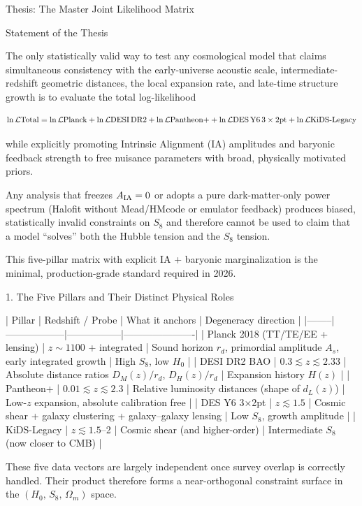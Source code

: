 Thesis: The Master Joint Likelihood Matrix

Statement of the Thesis

The only statistically valid way to test any cosmological model that claims simultaneous consistency with the early-universe acoustic scale, intermediate-redshift geometric distances, the local expansion rate, and late-time structure growth is to evaluate the total log-likelihood

\[
\ln\mathcal{L}{\rm Total} = \ln\mathcal{L}{\rm Planck} + \ln\mathcal{L}{\rm DESI\,DR2} + \ln\mathcal{L}{\rm Pantheon+} + \ln\mathcal{L}{\rm DES\,Y6\,3\times2pt} + \ln\mathcal{L}{\rm KiDS\text{-}Legacy}
\]

while explicitly promoting Intrinsic Alignment (IA) amplitudes and baryonic feedback strength to free nuisance parameters with broad, physically motivated priors.  

Any analysis that freezes \(A_{\rm IA}=0\) or adopts a pure dark-matter-only power spectrum (Halofit without Mead/HMcode or emulator feedback) produces biased, statistically invalid constraints on \(S_8\) and therefore cannot be used to claim that a model “solves” both the Hubble tension and the \(S_8\) tension.

This five-pillar matrix with explicit IA + baryonic marginalization is the minimal, production-grade standard required in 2026.

1. The Five Pillars and Their Distinct Physical Roles

| Pillar | Redshift / Probe | What it anchors | Degeneracy direction |
|--------|------------------|-----------------|----------------------|
| Planck 2018 (TT/TE/EE + lensing) | \(z\sim 1100\) + integrated | Sound horizon \(r_d\), primordial amplitude \(A_s\), early integrated growth | High \(S_8\), low \(H_0\) |
| DESI DR2 BAO | \(0.3 \lesssim z \lesssim 2.33\) | Absolute distance ratios \(D_M(z)/r_d\), \(D_H(z)/r_d\) | Expansion history \(H(z)\) |
| Pantheon+ | \(0.01 \lesssim z \lesssim 2.3\) | Relative luminosity distances (shape of \(d_L(z)\)) | Low-\(z\) expansion, absolute calibration free |
| DES Y6 3×2pt | \(z\lesssim 1.5\) | Cosmic shear + galaxy clustering + galaxy–galaxy lensing | Low \(S_8\), growth amplitude |
| KiDS-Legacy | \(z\lesssim 1.5\)–2 | Cosmic shear (and higher-order) | Intermediate \(S_8\) (now closer to CMB) |

These five data vectors are largely independent once survey overlap is correctly handled. Their product therefore forms a near-orthogonal constraint surface in the \((H_0,\,S_8,\,\Omega_m)\) space.

